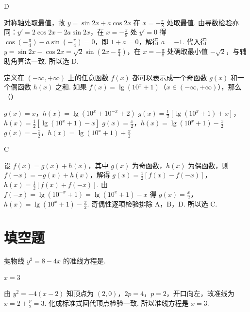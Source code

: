 \begin{answer}
D
\end{answer}

\begin{solution}
对称轴处取最值，故 \(y=\sin 2x+a\cos 2x\) 在 \(x=-\frac{\pi}{8}\) 处取最值. 由导数检验亦同：\(y'=2\cos 2x-2a\sin 2x\)，在 \(x=-\frac{\pi}{8}\) 处 \(y'=0\) 得 \(\cos\left( -\frac{\pi}{4} \right)-a\sin\left( -\frac{\pi}{4} \right)=0\)，即 \(1+a=0\)，解得 \(a=-1\). 代入得 \(y=\sin 2x-\cos 2x=\sqrt{2}\sin\left( 2x-\frac{\pi}{4} \right)\)，在 \(x=-\frac{\pi}{8}\) 处确取最小值 \(-\sqrt{2}\)，与辅助角算法一致. 所以选 D.
\end{solution}

\begin{problem}
定义在 \((-\infty,+\infty)\) 上的任意函数 \(f(x)\) 都可以表示成一个奇函数 \(g(x)\) 和一个偶函数 \(h(x)\) 之和. 如果 \(f(x)=\lg(10^{x}+1)\)（\(x\in(-\infty,+\infty)\)），那么（\quad）

\choices
    {\(g(x)=x\)，\(h(x)=\lg(10^{x}+10^{-x}+2)\)}
    {\(g(x)=\frac{1}{2}[\lg(10^{x}+1)+x]\)，\(h(x)=\frac{1}{2}[\lg(10^{x}+1)-x]\)}
    {\(g(x)=\frac{x}{2}\)，\(h(x)=\lg(10^{x}+1)-\frac{x}{2}\)}
    {\(g(x)=-\frac{x}{2}\)，\(h(x)=\lg(10^{x}+1)+\frac{x}{2}\)}
\end{problem}

\begin{answer}
C
\end{answer}

\begin{solution}
设 \(f(x)=g(x)+h(x)\)，其中 \(g(x)\) 为奇函数，\(h(x)\) 为偶函数，则 \(f(-x)=-g(x)+h(x)\)，解得 \(g(x)=\frac{1}{2}[f(x)-f(-x)]\)，\(h(x)=\frac{1}{2}[f(x)+f(-x)]\). 由 \(f(-x)=\lg(10^{-x}+1)=\lg(10^{x}+1)-x\) 得 \(g(x)=\frac{x}{2}\)，\(h(x)=\lg(10^{x}+1)-\frac{x}{2}\). 奇偶性逐项检验排除 A，B，D. 所以选 C.
\end{solution}

\section{填空题}

\begin{problem}
抛物线 \(y^{2}=8-4x\) 的准线方程是\fillinblank{}.
\end{problem}

\begin{answer}
\(x=3\)
\end{answer}

\begin{solution}
由 \(y^{2}=-4\left( x-2 \right)\) 知顶点为 \((2,0)\)，\(2p=4\)，\(p=2\)，开口向左，故准线为 \(x=2+\frac{p}{2}=3\). 化成标准式回代顶点检验一致. 所以准线方程是 \(x=3\).
\end{solution}

